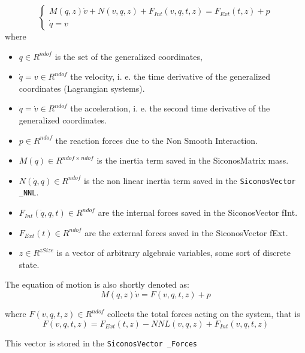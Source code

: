 \begin{equation}
  \begin{cases}
    M(q,z) \dot v + N(v, q, z) + F_{Int}(v , q , t, z) = F_{Ext}(t, z) + p \\
    \dot q = v
  \end{cases}
\end{equation}
 where
 \begin{itemize}
 \item  $q \in R^{ndof} $ is the set of the generalized
   coordinates,
 \item $ \dot q =v \in R^{ndof} $ the velocity,
   i. e. the time derivative of the generalized coordinates
   (Lagrangian systems).
 \item $ \ddot q =\dot v \in R^{ndof} $ the
   acceleration, i. e. the second time derivative of the generalized
   coordinates.
 \item $ p \in R^{ndof} $ the reaction forces due to
   the Non Smooth Interaction.
 \item $ M(q) \in R^{ndof \times ndof}
   $ is the inertia term saved in the SiconosMatrix mass.
 \item $
   N(\dot q, q) \in R^{ndof}$ is the non linear inertia term saved
   in the {\tt SiconosVector \_NNL}.
 \item $ F_{Int}(\dot q , q , t) \in
   R^{ndof} $ are the internal forces saved in the SiconosVector
   fInt.
 \item $ F_{Ext}(t) \in R^{ndof} $ are the external forces
   saved in the SiconosVector fExt.
 \item $ z \in R^{zSize}$ is a
   vector of arbitrary algebraic variables, some sort of discrete
   state.
 \end{itemize}


  The equation of motion is also shortly denoted as:
  \begin{equation}
  M(q,z) \dot v = F(v, q, t, z) + p
\end{equation}

  where  $F(v, q, t, z) \in R^{ndof} $ collects the total forces
  acting on the system, that is
  \begin{equation}
    F(v, q, t, z) =  F_{Ext}(t, z) -  NNL(v, q, z) + F_{Int}(v, q , t, z)
\end{equation}

 This vector is stored in the  {\tt SiconosVector \_Forces  }

